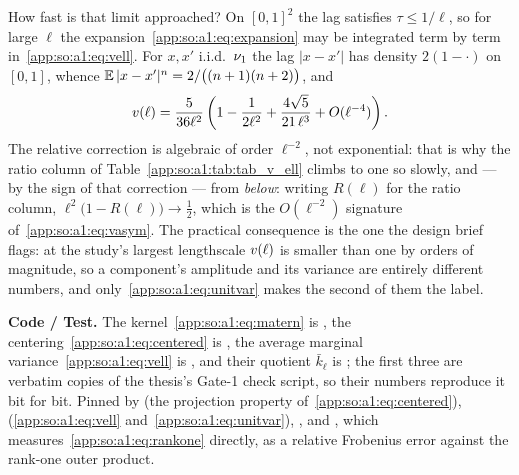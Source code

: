 How fast is that limit approached? On ${[0,1]}^2$ the lag satisfies
$\tau\le1/\ell$, so for large $\ell$ the
expansion~\eqref{app:so:a1:eq:expansion} may be integrated term by term
in~\eqref{app:so:a1:eq:vell}. For $x,x'$ i.i.d.\ $\nu_1$ the lag $|x-x'|$
has density $2(1-\cdot)$ on $[0,1]$, whence
$\Ex{}|x-x'|^n=2/\bigl((n+1)(n+2)\bigr)$, and
\begin{equation}\label{app:so:a1:eq:vasym}
  v(\ell)=\frac{5}{36\ell^2}
    \left(1-\frac{1}{2\ell^2}+\frac{4\sqrt5}{21\,\ell^3}+O(\ell^{-4})\right).
\end{equation}
The relative correction is algebraic of order $\ell^{-2}$, not exponential:
that is why the ratio column of Table~\ref{app:so:a1:tab:tab_v_ell} climbs to
one so slowly, and --- by the sign of that correction --- from \emph{below}:
writing $R(\ell)$ for the ratio column,
$\ell^2\bigl(1-R(\ell)\bigr)\to\tfrac12$, which is the $O(\ell^{-2})$
signature of~\eqref{app:so:a1:eq:vasym}. The practical consequence is the one
the design brief flags: at the study's largest lengthscale $\vell{\ell}$ is
smaller than one by orders of magnitude, so a component's amplitude and its
variance are entirely different numbers, and only~\eqref{app:so:a1:eq:unitvar}
makes the second of them the label.

\begin{table}[htbp]
  \centering
  \caption[$\vell{\ell}$ and the quantities derived from it]{
  $\vell{\ell}$ at every lengthscale the study uses and at the further
  reference lengthscales  pins, with its
  large-$\ell$ limit $5/(36\ell^2)$ and their ratio, the slope factor
  $5/(3\ell^2\vell{\ell})$ of~\eqref{app:so:a1:eq:slopefactor}, and the
  matched sinusoid frequency $\omega(\ell)$ of~\eqref{app:so:a1:eq:omega}.
  Closed form: every entry is the deterministic
  quadrature~\eqref{app:so:a1:eq:vell} or an algebraic function of it, and no
  draw enters. The ratio column approaches one at the algebraic
  rate~\eqref{app:so:a1:eq:vasym} predicts.}\label{app:so:a1:tab:tab_v_ell}
  \small\setlength{\tabcolsep}{3pt}
  
\end{table}

\begin{sloppypar}
\textbf{Code / Test.} The kernel~\eqref{app:so:a1:eq:matern} is
, the centering~\eqref{app:so:a1:eq:centered} is
, the average marginal
variance~\eqref{app:so:a1:eq:vell} is , and their quotient
$\bar k_\ell$ is ; the first three are verbatim
copies of the thesis's Gate-1 check script, so their numbers reproduce it bit
for bit. Pinned by
 (the
projection property of~\eqref{app:so:a1:eq:centered}),
(\eqref{app:so:a1:eq:vell} and~\eqref{app:so:a1:eq:unitvar}),
,
 and
, which
measures~\eqref{app:so:a1:eq:rankone} directly, as a relative Frobenius error
against the rank-one outer product.
\end{sloppypar}

